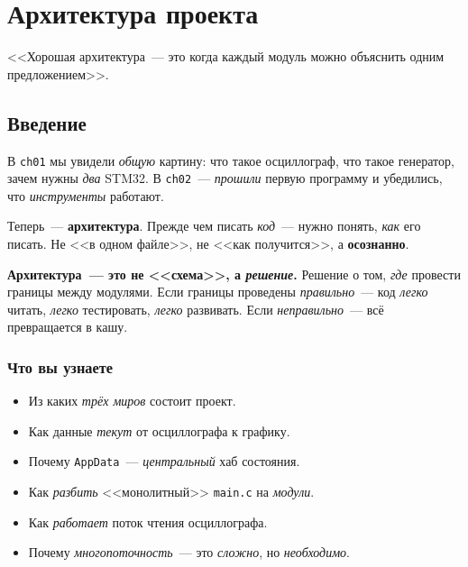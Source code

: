 
\chapter{Архитектура проекта}
\label{ch:architecture}

\epigraph{<<Хорошая архитектура~--- это когда каждый модуль
можно объяснить одним предложением>>.}{}

\section{Введение}
\label{sec:arch-intro}

В \texttt{ch01} мы увидели \emph{общую} картину: что такое
осциллограф, что такое генератор, зачем нужны \emph{два}
STM32. В \texttt{ch02}~--- \emph{прошили} первую программу
и убедились, что \emph{инструменты} работают.

Теперь~--- \textbf{архитектура}. Прежде чем писать
\emph{код}~--- нужно понять, \emph{как} его писать.
Не <<в одном файле>>, не <<как получится>>, а
\textbf{осознанно}.

\begin{ideabox}
\textbf{Архитектура~--- это не <<схема>>, а \emph{решение}.}
Решение о том, \emph{где} провести границы между модулями.
Если границы проведены \emph{правильно}~--- код \emph{легко}
читать, \emph{легко} тестировать, \emph{легко} развивать.
Если \emph{неправильно}~--- всё превращается в кашу.
\end{ideabox}

\subsection{Что вы узнаете}

\begin{itemize}
    \item Из каких \emph{трёх миров} состоит проект.
    \item Как данные \emph{текут} от осциллографа к графику.
    \item Почему \texttt{AppData}~--- \emph{центральный} хаб состояния.
    \item Как \emph{разбить} <<монолитный>> \texttt{main.c}
          на \emph{модули}.
    \item Как \emph{работает} поток чтения осциллографа.
    \item Почему \emph{многопоточность}~--- это \emph{сложно},
          но \emph{необходимо}.
\end{itemize}

